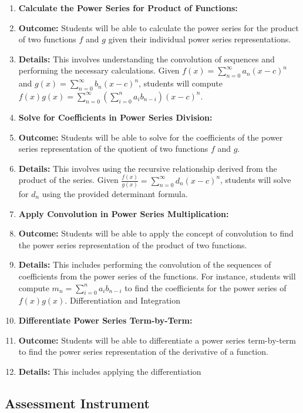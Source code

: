 \begin{enumerate}
    \item \textbf{Calculate the Power Series for Product of Functions:}
    \item \textbf{Outcome:} Students will be able to calculate the power series for the product of two functions \( f \) and \( g \) given their individual power series representations.
    \item \textbf{Details:} This involves understanding the convolution of sequences and performing the necessary calculations. Given \( f(x) = \sum_{n=0}^\infty a_n (x - c)^n \) and \( g(x) = \sum_{n=0}^\infty b_n (x - c)^n \), students will compute \( f(x)g(x) = \sum_{n=0}^\infty \left( \sum_{i=0}^n a_i b_{n-i} \right) (x - c)^n \).
    \item \textbf{Solve for Coefficients in Power Series Division:}
    \item \textbf{Outcome:} Students will be able to solve for the coefficients of the power series representation of the quotient of two functions \( f \) and \( g \).
    \item \textbf{Details:} This involves using the recursive relationship derived from the product of the series. Given \( \frac{f(x)}{g(x)} = \sum_{n=0}^\infty d_n (x - c)^n \), students will solve for \( d_n \) using the provided determinant formula.
    \item \textbf{Apply Convolution in Power Series Multiplication:}
    \item \textbf{Outcome:} Students will be able to apply the concept of convolution to find the power series representation of the product of two functions.
    \item \textbf{Details:} This includes performing the convolution of the sequences of coefficients from the power series of the functions. For instance, students will compute \( m_n = \sum_{i=0}^n a_i b_{n-i} \) to find the coefficients for the power series of \( f(x)g(x) \). Differentiation and Integration
    \item \textbf{Differentiate Power Series Term-by-Term:}
    \item \textbf{Outcome:} Students will be able to differentiate a power series term-by-term to find the power series representation of the derivative of a function.
    \item \textbf{Details:} This includes applying the differentiation
\end{enumerate}

\subsection{Assessment Instrument}
\label{ssec:prop-3ce7}

